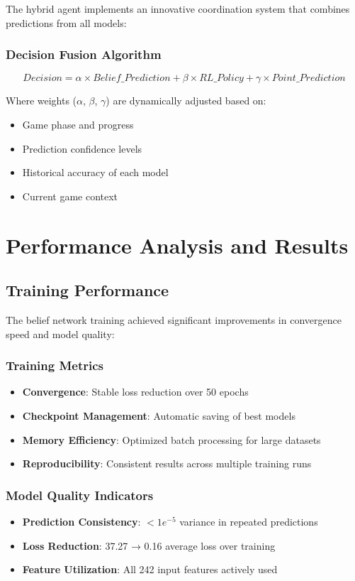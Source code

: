 \documentclass[conference]{IEEEtran}
\begin{document}
The hybrid agent implements an innovative coordination system that combines predictions from all models:

\subsubsection{Decision Fusion Algorithm}
\begin{equation}
Decision = \alpha \times Belief\_Prediction + \beta \times RL\_Policy + \gamma \times Point\_Prediction
\end{equation}

Where weights ($\alpha$, $\beta$, $\gamma$) are dynamically adjusted based on:
\begin{itemize}
    \item Game phase and progress
    \item Prediction confidence levels
    \item Historical accuracy of each model
    \item Current game context
\end{itemize}

\section{Performance Analysis and Results}

\subsection{Training Performance}

The belief network training achieved significant improvements in convergence speed and model quality:

\subsubsection{Training Metrics}
\begin{itemize}
    \item \textbf{Convergence}: Stable loss reduction over 50 epochs
    \item \textbf{Checkpoint Management}: Automatic saving of best models
    \item \textbf{Memory Efficiency}: Optimized batch processing for large datasets
    \item \textbf{Reproducibility}: Consistent results across multiple training runs
\end{itemize}

\subsubsection{Model Quality Indicators}
\begin{itemize}
    \item \textbf{Prediction Consistency}: $< 1e^{-5}$ variance in repeated predictions
    \item \textbf{Loss Reduction}: 37.27 → 0.16 average loss over training
    \item \textbf{Feature Utilization}: All 242 input features actively used
\end{itemize}
\end{document}
